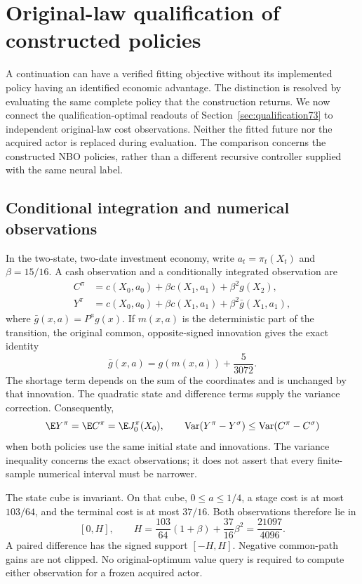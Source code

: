 \section{Original-law qualification of constructed policies}\label{sec:cost77}
A continuation can have a verified fitting objective without its implemented policy having an identified economic advantage. The distinction is resolved by evaluating the same complete policy that the construction returns. We now connect the qualification-optimal readouts of Section~\ref{sec:qualification73} to independent original-law cost observations. Neither the fitted future nor the acquired actor is replaced during evaluation. The comparison concerns the constructed NBO policies, rather than a different recursive controller supplied with the same neural label.

\subsection{Conditional integration and numerical observations}
In the two-state, two-date investment economy, write $a_t=\pi_t(X_t)$ and $\beta=15/16$. A cash observation and a conditionally integrated observation are
\begin{align}
 C^\pi&=c(X_0,a_0)+\beta c(X_1,a_1)+\beta^2g(X_2),\label{eq:cash77}\\
 Y^\pi&=c(X_0,a_0)+\beta c(X_1,a_1)
                    +\beta^2\bar g(X_1,a_1),\label{eq:conditional77}
\end{align}
where $\bar g(x,a)=P^ag(x)$. If $m(x,a)$ is the deterministic part of the transition, the original common, opposite-signed innovation gives the exact identity
\begin{equation}\label{eq:last-moment77}
 \bar g(x,a)=g(m(x,a))+\frac{5}{3072}.
\end{equation}
The shortage term depends on the sum of the coordinates and is unchanged by that innovation. The quadratic state and difference terms supply the variance correction. Consequently,
\[
 \E Y^\pi=\E C^\pi=\E J_0^\pi(X_0),\qquad
 \operatorname{Var}(Y^\pi-Y^\sigma)
       \le\operatorname{Var}(C^\pi-C^\sigma)
\]
when both policies use the same initial state and innovations. The variance inequality concerns the exact observations; it does not assert that every finite-sample numerical interval must be narrower.

The state cube is invariant. On that cube, $0\le a\le1/4$, a stage cost is at most $103/64$, and the terminal cost is at most $37/16$. Both observations therefore lie in
\begin{equation}\label{eq:support77}
 [0,H],\qquad H=\frac{103}{64}(1+\beta)+\frac{37}{16}\beta^2
                  =\frac{21097}{4096}.
\end{equation}
A paired difference has the signed support $[-H,H]$. Negative common-path gains are not clipped. No original-optimum value query is required to compute either observation for a frozen acquired actor.

